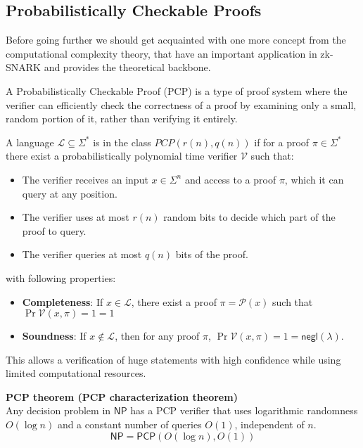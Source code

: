\documentclass[../lecture-notes.tex]{subfiles}
\begin{document}
\subsection{Probabilistically Checkable Proofs}

Before going further we should get acquainted with one more concept from the computational 
complexity theory, that have an important application in zk-SNARK and provides the theoretical 
backbone. 

A Probabilistically Checkable Proof (PCP) is a type of proof system where the verifier can 
efficiently check the correctness of a proof by examining only a small, random portion of it, rather
than verifying it entirely. 
\begin{definition}
    A language $\mathcal{L} \subseteq \Sigma^*$ is in the class $PCP(r(n), q(n))$ if for a proof 
    $\pi \in \Sigma^*$ there exist a probabilistically polynomial time verifier $\mathcal{V}$ such
    that:
    \begin{itemize}
        \item The verifier receives an input $x \in \Sigma^n$ and access to a proof $\pi$, which it
            can query at any position.
        \item The verifier uses at most $r(n)$ random bits to decide which part of the proof to 
            query.
        \item The verifier queries at most $q(n)$ bits of the proof.
    \end{itemize}
    with following properties:
    \begin{itemize}
        \item \textbf{Completeness}: If $x \in \mathcal{L}$, there exist a proof 
            $\pi = \mathcal{P}(x)$ such that $\Pr{\mathcal{V}(x, \pi) = 1} = 1$
        \item \textbf{Soundness}: If $x \notin \mathcal{L}$, then for any proof 
            $\pi$, $\Pr{\mathcal{V}(x, \pi) = 1} = \mathsf{negl}(\lambda)$.
    \end{itemize}
\end{definition}
This allows a verification of huge statements with high confidence while using limited computational
resources.

\begin{theorem}{\textbf{PCP theorem (PCP characterization theorem)}\\}
    Any decision problem in $\mathsf{NP}$ has a PCP verifier that uses logarithmic randomness 
    $O(\log n)$ and a constant number of queries $O(1)$, independent of $n$.
    \begin{equation*}
        \mathsf{NP} = \mathsf{PCP}(O(\log n), O(1))
    \end{equation*}
\end{theorem}
\end{document}
